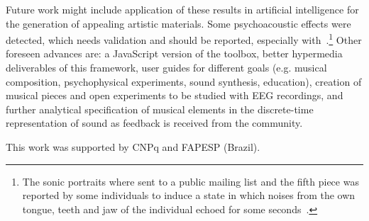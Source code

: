 
Future work might include application of these results in artificial intelligence
for the generation of appealing artistic materials. Some psychoacoustic effects were detected,
which needs validation and should be reported, especially with~\cite{quadrosSonoros}.\footnote{The sonic portraits where sent to a public mailing list and the fifth piece was reported by some individuals to induce a state in which noises from the own tongue, teeth and jaw of the individual echoed for some seconds~\cite{quadrosMetarec}.} Other foreseen advances
are: a JavaScript version of the toolbox, better hypermedia deliverables of this framework, user guides
for different goals (e.g. musical composition, psychophysical experiments, sound synthesis, education), creation
of musical pieces and open experiments to be studied with EEG recordings, and further analytical specification of musical
elements in the discrete-time representation of sound as feedback is received from the community.

\begin{acks}
This work was supported by CNPq and FAPESP (Brazil).
\end{acks}


% 

